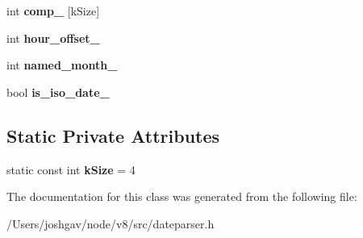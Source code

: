 \begin{DoxyCompactItemize}
\item 
int {\bfseries comp\+\_\+} \mbox{[}k\+Size\mbox{]}\hypertarget{classv8_1_1internal_1_1_date_parser_1_1_b_a_s_e___e_m_b_e_d_d_e_d_a3ae6a0fea2d23318fe199335ae4d9b6e}{}\label{classv8_1_1internal_1_1_date_parser_1_1_b_a_s_e___e_m_b_e_d_d_e_d_a3ae6a0fea2d23318fe199335ae4d9b6e}

\item 
int {\bfseries hour\+\_\+offset\+\_\+}\hypertarget{classv8_1_1internal_1_1_date_parser_1_1_b_a_s_e___e_m_b_e_d_d_e_d_a8fd025fc6230320c27cc87175298929c}{}\label{classv8_1_1internal_1_1_date_parser_1_1_b_a_s_e___e_m_b_e_d_d_e_d_a8fd025fc6230320c27cc87175298929c}

\item 
int {\bfseries named\+\_\+month\+\_\+}\hypertarget{classv8_1_1internal_1_1_date_parser_1_1_b_a_s_e___e_m_b_e_d_d_e_d_a820fba652eecb9545010c26e26dc1176}{}\label{classv8_1_1internal_1_1_date_parser_1_1_b_a_s_e___e_m_b_e_d_d_e_d_a820fba652eecb9545010c26e26dc1176}

\item 
bool {\bfseries is\+\_\+iso\+\_\+date\+\_\+}\hypertarget{classv8_1_1internal_1_1_date_parser_1_1_b_a_s_e___e_m_b_e_d_d_e_d_a3d11cccaa5ecd9cc93d69936e934b647}{}\label{classv8_1_1internal_1_1_date_parser_1_1_b_a_s_e___e_m_b_e_d_d_e_d_a3d11cccaa5ecd9cc93d69936e934b647}

\end{DoxyCompactItemize}
\subsection*{Static Private Attributes}
\begin{DoxyCompactItemize}
\item 
static const int {\bfseries k\+Size} = 4\hypertarget{classv8_1_1internal_1_1_date_parser_1_1_b_a_s_e___e_m_b_e_d_d_e_d_ac84604a2d31c3d6bd13bb78503d888d4}{}\label{classv8_1_1internal_1_1_date_parser_1_1_b_a_s_e___e_m_b_e_d_d_e_d_ac84604a2d31c3d6bd13bb78503d888d4}

\end{DoxyCompactItemize}


The documentation for this class was generated from the following file\+:\begin{DoxyCompactItemize}
\item 
/\+Users/joshgav/node/v8/src/dateparser.\+h\end{DoxyCompactItemize}
